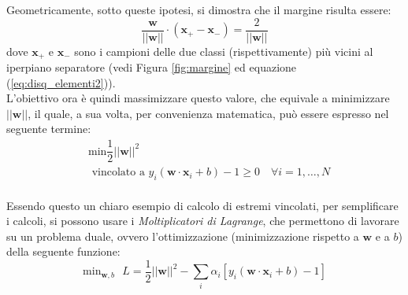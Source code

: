 Geometricamente, sotto queste ipotesi, si dimostra che il margine risulta essere: 
\begin{equation}
\label{eq:margine}
\dfrac{\mathbf{w}}{\vert\vert\mathbf{w}\vert\vert}\cdot\left (\mathbf{x}_+-\mathbf{x}_-\right )=\dfrac{2}{\vert\vert\mathbf{w}\vert\vert}
\end{equation}
dove $\mathbf{x}_+$ e $\mathbf{x}_-$ sono i campioni delle due classi (rispettivamente) più vicini al iperpiano separatore (vedi Figura \ref{fig:margine} ed equazione (\ref{eq:disq_elementi2})).
\\
L'obiettivo ora è quindi massimizzare questo valore, che equivale a minimizzare $\vert\vert\mathbf{w}\vert\vert$, il quale, a sua volta, per convenienza matematica, può essere espresso nel seguente termine:
\begin{eqnarray}\nonumber
\label{eq:problema_di_minimizzazione}
&\text{min}\dfrac{1}{2}\vert\vert\mathbf{w}\vert\vert^2\\
&\text{ vincolato a }y_i\left (\mathbf{w}\cdot\mathbf{x}_i+b\right )-1\geq0 \quad \forall i=1,\ldots,N
\end{eqnarray}
\\
Essendo questo un chiaro esempio di calcolo di estremi vincolati, per semplificare i calcoli, si possono usare i \textit{Moltiplicatori di Lagrange}, che permettono di lavorare su un problema duale, ovvero l'ottimizzazione (minimizzazione rispetto a $\mathbf{w}$ e a $b$) della seguente funzione:
\begin{equation}
\label{eq:lagrangiana}
\text{min}_{\mathbf{w},b}\text{ }L=\dfrac{1}{2}\vert\vert\mathbf{w}\vert\vert^2-\sum_i\alpha_i\left [y_i\left (\mathbf{w}\cdot\mathbf{x}_i+b\right )-1\right ]
\end{equation}
